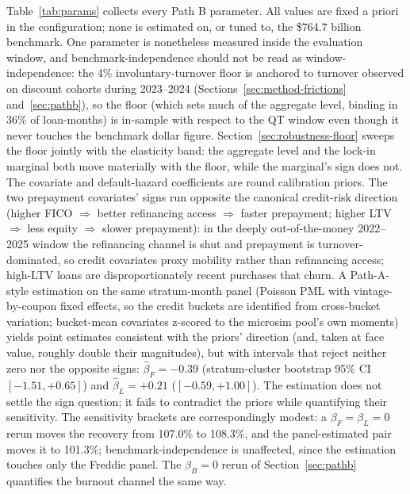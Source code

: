 \documentclass[12pt]{article}
\begin{document}
Table~\ref{tab:params} collects every Path B parameter. All values are fixed a priori in the configuration; none is estimated on, or tuned to, the \$764.7 billion benchmark. One parameter is nonetheless measured inside the evaluation window, and benchmark-independence should not be read as window-independence: the 4\% involuntary-turnover floor is anchored to turnover observed on discount cohorts during 2023--2024 (Sections~\ref{sec:method-frictions} and~\ref{sec:pathb}), so the floor (which sets much of the aggregate level, binding in 36\% of loan-months) is in-sample with respect to the QT window even though it never touches the benchmark dollar figure. Section~\ref{sec:robustness-floor} sweeps the floor jointly with the elasticity band: the aggregate level and the lock-in marginal both move materially with the floor, while the marginal's sign does not. The covariate and default-hazard coefficients are round calibration priors. The two prepayment covariates' signs run opposite the canonical credit-risk direction (higher FICO $\Rightarrow$ better refinancing access $\Rightarrow$ faster prepayment; higher LTV $\Rightarrow$ less equity $\Rightarrow$ slower prepayment): in the deeply out-of-the-money 2022--2025 window the refinancing channel is shut and prepayment is turnover-dominated, so credit covariates proxy mobility rather than refinancing access; high-LTV loans are disproportionately recent purchases that churn. A Path-A-style estimation on the same stratum-month panel (Poisson PML with vintage-by-coupon fixed effects, so the credit buckets are identified from cross-bucket variation; bucket-mean covariates z-scored to the microsim pool's own moments) yields point estimates consistent with the priors' direction (and, taken at face value, roughly double their magnitudes), but with intervals that reject neither zero nor the opposite signs: $\hat{\beta}_F = -0.39$ (stratum-cluster bootstrap 95\% CI $[-1.51, +0.65]$) and $\hat{\beta}_L = +0.21$ ($[-0.59, +1.00]$). The estimation does not settle the sign question; it fails to contradict the priors while quantifying their sensitivity. The sensitivity brackets are correspondingly modest: a $\beta_F = \beta_L = 0$ rerun moves the recovery from 107.0\% to 108.3\%, and the panel-estimated pair moves it to 101.3\%; benchmark-independence is unaffected, since the estimation touches only the Freddie panel. The $\beta_B = 0$ rerun of Section~\ref{sec:pathb} quantifies the burnout channel the same way.
\end{document}
